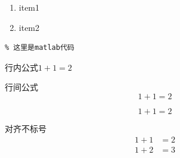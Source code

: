 \documentclass[UTF8]{ctexart}
\begin{document}
\begin{enumerate}
\item item1
\item item2
\end{enumerate}

\begin{lstlisting}
% 这里是matlab代码
\end{lstlisting}

行内公式$1+1=2$

行间公式
$$
1+1=2
$$

\[
1+1=2
\]

对齐不标号
\begin{align*}
1+1&=2\\
1+2&=3
\end{align*}







\end{document}
